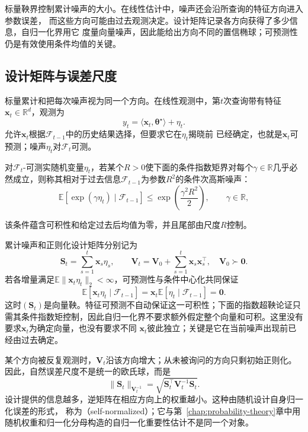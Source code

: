 标量鞅界控制累计噪声的大小。在线性估计中，噪声还会沿所查询的特征方向进入参数误差，
而这些方向可能由过去观测决定。设计矩阵记录各方向获得了多少信息，自归一化界用它
度量向量噪声，因此能给出方向不同的置信椭球；可预测性仍是有效使用条件均值的关键。

\subsection{设计矩阵与误差尺度}

标量累计和把每次噪声视为同一个方向。在线性观测中，第$t$次查询带有特征
$\bm{x}_t\in\mathbb{R}^d$，观测为
\begin{equation}
  y_t=\langle\bm{x}_t,\bm{\theta}^{\star}\rangle+\eta_t.
  \label{eq:stoch-adaptive-linear-observation}
\end{equation}
允许$\bm{x}_t$根据$\mathcal{F}_{t-1}$中的历史结果选择，但要求它在$\eta_t$揭晓前
已经确定，也就是$\bm{x}_t$可预测；噪声$\eta_t$对$\mathcal{F}_t$可测。
\begin{definition}[条件次高斯噪声]
  \label{def:stoch-conditional-subgaussian}
对\(\mathcal F_t\)-可测实随机变量\(\eta_t\)，若某个$R>0$使下面的条件指数矩界对每个\(\gamma\in\mathbb R\)几乎必然成立，则称其相对于过去信息\(\mathcal F_{t-1}\)为参数\(R^2\)的条件次高斯噪声：
\begin{equation}
  \mathbb{E}[
    \exp(\gamma\eta_t)
    \mid\mathcal{F}_{t-1}]
  \leq
  \exp\left(\frac{\gamma^2R^2}{2}\right),
  \qquad \gamma\in\mathbb{R},
  \label{eq:stoch-conditional-subgaussian}
\end{equation}
\end{definition}
该条件蕴含可积性和给定过去后均值为零，并且尾部由尺度$R$控制。

累计噪声和正则化设计矩阵分别记为
\begin{equation}
  \bm{S}_t=\sum_{s=1}^{t}\bm{x}_s\eta_s,
  \qquad
  \bm{V}_t=\bm{V}_0+\sum_{s=1}^{t}\bm{x}_s\bm{x}_s^{\top},
  \quad\bm{V}_0\succ\bm{0}.
  \label{eq:stoch-vector-sum-design}
\end{equation}
若各增量满足\(\mathbb E\lVert\bm x_t\eta_t\rVert_2<\infty\)，可预测性与条件中心化共同保证
\[
  \mathbb{E}[\bm{x}_t\eta_t\mid\mathcal{F}_{t-1}]
  =
  \bm{x}_t
  \mathbb{E}[\eta_t\mid\mathcal{F}_{t-1}]
  =\bm{0}.
\]
这时$(\bm{S}_t)$是向量鞅。特征可预测不自动保证这一可积性；下面的指数超鞅论证只需其条件指数矩控制，因此自归一化界不要求额外假定整个向量和可积。这里没有要求$\bm{x}_t$为确定向量，也没有要求不同
$\bm{x}_t$彼此独立；关键是它在当前噪声出现前已经由过去确定。

某个方向被反复观测时，$\bm{V}_t$沿该方向增大；从未被询问的方向只剩初始正则化。
因此，自然误差尺度不是统一的欧氏球，而是
\[
  \lVert\bm{S}_t\rVert_{\bm{V}_t^{-1}}
  =\sqrt{\bm{S}_t^{\top}\bm{V}_t^{-1}\bm{S}_t}.
\]
设计提供的信息越多，逆矩阵在相应方向上的权重越小。这种由随机设计自身归一化误差的形式，
称为（self-normalized）；它与第~\ref{chap:probability-theory}章中用
随机权重和归一化分母构造的自归一化重要性估计不是同一个对象。

